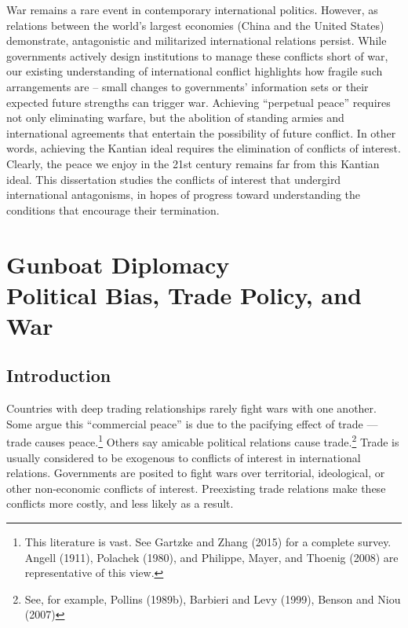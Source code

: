 \documentclass{puthesis}
\begin{document}
War remains a rare event in contemporary international politics.
However, as relations between the world's largest economies (China and
the United States) demonstrate, antagonistic and militarized
international relations persist. While governments actively design
institutions to manage these conflicts short of war, our existing
understanding of international conflict highlights how fragile such
arrangements are -- small changes to governments' information sets or
their expected future strengths can trigger war. Achieving ``perpetual
peace'' requires not only eliminating warfare, but the abolition of
standing armies and international agreements that entertain the
possibility of future conflict. In other words, achieving the Kantian
ideal requires the elimination of conflicts of interest. Clearly, the
peace we enjoy in the 21st century remains far from this Kantian ideal.
This dissertation studies the conflicts of interest that undergird
international antagonisms, in hopes of progress toward understanding the
conditions that encourage their termination.

\chapter[Gunboat Diplomacy: Political Bias, Trade Policy, and War]{Gunboat Diplomacy \\ \Large Political Bias, Trade Policy, and War}

\section{Introduction}

Countries with deep trading relationships rarely fight wars with one
another. Some argue this ``commercial peace'' is due to the pacifying
effect of trade --- trade causes peace.\footnote{This literature is
  vast. See Gartzke and Zhang (2015) for a complete survey. Angell
  (1911), Polachek (1980), and Philippe, Mayer, and Thoenig (2008) are
  representative of this view.} Others say amicable political relations
cause trade.\footnote{See, for example, Pollins (1989b), Barbieri and
  Levy (1999), Benson and Niou (2007)} Trade is usually considered to be
exogenous to conflicts of interest in international relations.
Governments are posited to fight wars over territorial, ideological, or
other non-economic conflicts of interest. Preexisting trade relations
make these conflicts more costly, and less likely as a result.
\end{document}
